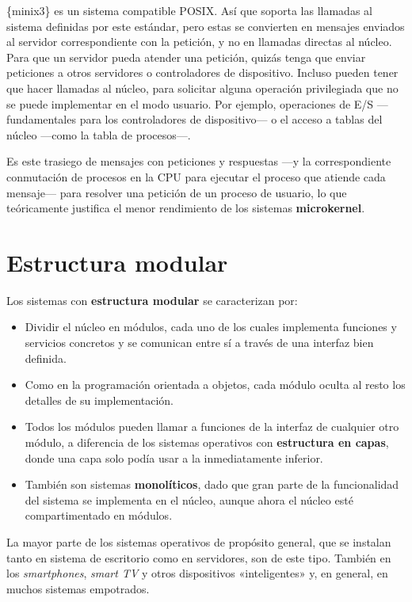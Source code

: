 \{minix3\} es un sistema compatible POSIX. Así que soporta las llamadas
al sistema definidas por este estándar, pero estas se convierten en
mensajes enviados al servidor correspondiente con la petición, y no en
llamadas directas al núcleo. Para que un servidor pueda atender una
petición, quizás tenga que enviar peticiones a otros servidores o
controladores de dispositivo. Incluso pueden tener que hacer llamadas al
núcleo, para solicitar alguna operación privilegiada que no se puede
implementar en el modo usuario. Por ejemplo, operaciones de E/S
---fundamentales para los controladores de dispositivo--- o el acceso a
tablas del núcleo ---como la tabla de procesos---.

Es este trasiego de mensajes con peticiones y respuestas ---y la
correspondiente conmutación de procesos en la CPU para ejecutar el
proceso que atiende cada mensaje--- para resolver una petición de un
proceso de usuario, lo que teóricamente justifica el menor rendimiento
de los sistemas \textbf{microkernel}.

\section{Estructura modular}\label{_estructura_modular}

Los sistemas con \textbf{estructura modular} se caracterizan por:

\begin{itemize}
\item
  Dividir el núcleo en módulos, cada uno de los cuales implementa
  funciones y servicios concretos y se comunican entre sí a través de
  una interfaz bien definida.
\item
  Como en la programación orientada a objetos, cada módulo oculta al
  resto los detalles de su implementación.
\item
  Todos los módulos pueden llamar a funciones de la interfaz de
  cualquier otro módulo, a diferencia de los sistemas operativos con
  \textbf{estructura en capas}, donde una capa solo podía usar a la
  inmediatamente inferior.
\item
  También son sistemas \textbf{monolíticos}, dado que gran parte de la
  funcionalidad del sistema se implementa en el núcleo, aunque ahora el
  núcleo esté compartimentado en módulos.
\end{itemize}

La mayor parte de los sistemas operativos de propósito general, que se
instalan tanto en sistema de escritorio como en servidores, son de este
tipo. También en los \emph{smartphones}, \emph{smart TV} y otros
dispositivos «inteligentes» y, en general, en muchos sistemas
empotrados.

